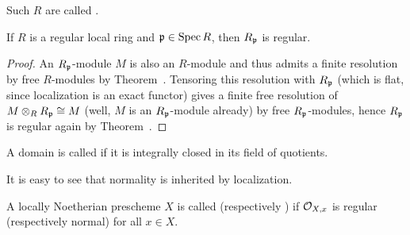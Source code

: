 \documentclass[a4paper,parskip=half,numbers=enddot, DIV=12]{scrreprt}
\begin{document}
\begin{defi} 
    Such $R$ are called .
\end{defi}
\begin{cor}
    If $R$ is a regular local ring and $\mathfrak{p}\in \operatorname{Spec} R$, then $R_{\mathfrak{p}}$ is regular.
\end{cor}
\begin{proof}
	An $R_{\mathfrak{p}}$-module $M$ is also an $R$-module and thus admits a finite resolution by free $R$-modules by Theorem~. Tensoring this resolution with $R_{\mathfrak{p}}$ (which is flat, since localization is an exact functor) gives a finite free resolution of $M\otimes_RR_{\mathfrak{p}}\cong M$ (well, $M$ is an $R_{\mathfrak{p}}$-module already) by free $R_{\mathfrak{p}}$-modules, hence $R_{\mathfrak{p}}$ is regular again by Theorem~.
\end{proof} 
\begin{defi}
    A domain is called  if it is integrally closed in its field of quotients.
\end{defi}
 It is easy to see that normality is inherited by localization. 
\begin{defi}
    A locally Noetherian prescheme $X$ is called  (respectively ) if $\mathcal{O}_{X,x}$ is regular (respectively normal) for all $x\in X$.
\end{defi}
\end{document}
